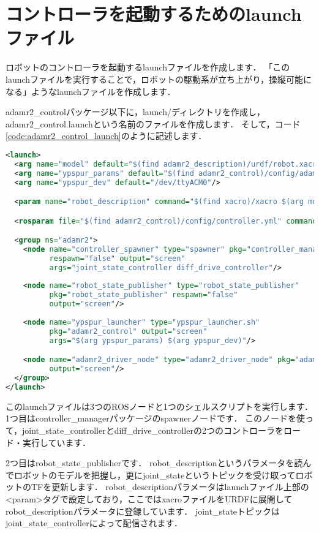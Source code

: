 \documentclass[{../../master}]{subfiles}
\begin{document}
\section{コントローラを起動するためのlaunchファイル}

ロボットのコントローラを起動するlaunchファイルを作成します．
「このlaunchファイルを実行することで，ロボットの駆動系が立ち上がり，操縦可能になる」ようなlaunchファイルを作成します．

\textsf{adamr2\_control}パッケージ以下に，\textsf{launch/}ディレクトリを作成し，\textsf{adamr2\_control.launch}という名前のファイルを作成します．
そして，コード\ref{code:adamr2_control_launch}のように記述します．

\begin{lstlisting}[language=XML, label=code:adamr2_control_launch, caption=\textsf{adamr2\_control.launch}]
<launch>
  <arg name="model" default="$(find adamr2_description)/urdf/robot.xacro"/>
  <arg name="ypspur_params" default="$(find adamr2_control)/config/adamr2.param"/>
  <arg name="ypspur_dev" default="/dev/ttyACM0"/>

  <param name="robot_description" command="$(find xacro)/xacro $(arg model)"/>

  <rosparam file="$(find adamr2_control)/config/controller.yml" command="load"/>

  <group ns="adamr2">
    <node name="controller_spawner" type="spawner" pkg="controller_manager"
          respawn="false" output="screen"
          args="joint_state_controller diff_drive_controller"/>
    
    <node name="robot_state_publisher" type="robot_state_publisher"
          pkg="robot_state_publisher" respawn="false"
          output="screen"/>
    
    <node name="ypspur_launcher" type="ypspur_launcher.sh"
          pkg="adamr2_control" output="screen"
          args="$(arg ypspur_params) $(arg ypspur_dev)"/>

    <node name="adamr2_driver_node" type="adamr2_driver_node" pkg="adamr2_driver"
          output="screen"/>
  </group>
</launch>
\end{lstlisting}

このlaunchファイルは3つのROSノードと1つのシェルスクリプトを実行します．
1つ目は\textsf{controller\_manager}パッケージの\textsf{spawner}ノードです．
このノードを使って，\textsf{joint\_state\_controller}と\textsf{diff\_drive\_controller}の2つのコントローラをロード・実行しています．

2つ目は\textsf{robot\_state\_publisher}です．
\textsf{robot\_description}というパラメータを読んでロボットのモデルを把握し，更に\textsf{joint\_state}というトピックを受け取ってロボットのTFを更新します．
\textsf{robot\_description}パラメータはlaunchファイル上部の\textsf{<param>}タグで設定しており，ここではxacroファイルをURDFに展開して\textsf{robot\_description}パラメータに登録しています．
\textsf{joint\_state}トピックは\textsf{joint\_state\_controller}によって配信されます．
\end{document}
